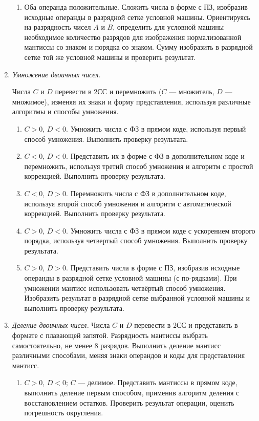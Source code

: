 \begin{enumerate}
\begin{enumerate}
        \item Оба операнда положительные. Сложить числа в форме с ПЗ, изобразив  исходные операнды в разрядной сетке условной машины. Ориентируясь на разрядность чисел $A$ и $B$, определить для условной машины необходимое количество разрядов для изображения нормализованной мантиссы со знаком и порядка со знаком. Сумму изобразить в разрядной сетке той же условной машины и проверить результат. 
    \end{enumerate}
        
    \item \emph{Умножение двоичных чисел.}
    
    Числа $C$ и $D$ перевести в 2СС и перемножить ($C$ --- множитель, $D$ --- множимое), изменяя их знаки и форму представления, используя различные алгоритмы и способы умножения.
    \begin{enumerate} 
        \item $C>0$, $D<0$. Умножить числа с ФЗ в прямом коде, используя первый способ умножения. Выполнить проверку результата.
        
        \item $C<0$, $D<0$.  Представить их в форме с ФЗ в дополнительном коде и перемножить, используя третий способ умножения и алгоритм с простой коррекцией. Выполнить проверку результата.

        \item $C<0$, $D>0$. Перемножить числа с ФЗ в дополнительном коде, используя второй способ умножения и алгоритм с автоматической коррекцией. Выполнить проверку результата.
        
        \item $C>0$, $D<0$. Умножить числа с ФЗ в прямом коде с ускорением второго порядка, используя четвертый способ умножения. Выполнить проверку результата.
        
        \item $C>0$, $D>0$. Представить числа в форме с ПЗ, изобразив исходные операнды в разрядной сетке условной машины (с по-рядками). При умножении мантисс использовать четвёртый способ умножения.  Изобразить результат в разрядной сетке выбранной условной машины и выполнить проверку результата.
    \end{enumerate} 

    \item \emph{Деление двоичных чисел.}
    Числа $C$ и $D$ перевести в 2СС и представить в формате с плавающей запятой. Разрядность мантиссы выбрать самостоятельно, не менее 8 разрядов. Выполнить деление мантисс различными способами, меняя знаки операндов и коды для представления мантисс.
    \begin{enumerate}
        \item $C>0$, $D<0$; $C$ --- делимое. Представить мантиссы в прямом коде, выполнить деление первым способом, применив алгоритм деления с восстановлением остатков. Проверить результат операции, оценить погрешность округления.
        

\end{enumerate}
\end{enumerate}
